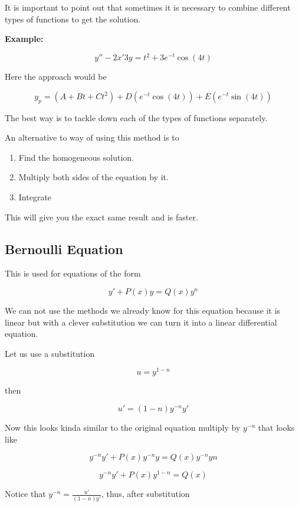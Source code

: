 It is important to point out that sometimes it is necessary to combine different types
of functions to get the solution.

\textbf{Example:}

\[
    y'' -2x' 3y = t^2  + 3e^{-t} \cos (4t)
\]

Here the approach would be

\[
    y_p = (A + Bt + Ct^2) + D(e^{-t}\cos(4t)) + E(e^{-t}\sin(4t))
\]

The best way is to tackle down each of the types of functions separately.

An alternative to way of using this method is to

\begin{enumerate}

    \item Find the homogeneous solution.

    \item Multiply both sides of the equation by it.

    \item Integrate

\end{enumerate}

This will give you the exact same result and is faster.

\subsection{Bernoulli Equation}

This is used for equations of the form 

\[
    y' + P(x)y = Q(x)y^n
\]

We can not use the methods we already know for this equation because it is linear but with a
clever substitution we can turn it into a linear differential equation.

Let us use a substitution 

\[
    u = y^{1 - n}
\] 

then 

\[
    u' = (1 - n)y^{-n} y'
\] 

Now this 
looks kinda similar to the original equation multiply by \(y^{-n}\) that looks like

\[
    y^{-n}y' + P(x)y^{-n}y = Q(x)y^{-n}y{n}
\]

\[
    y^{-n}y' + P(x)y^{1 - n} = Q(x)
\]

Notice that \(y^{-n} = \frac{u'}{(1-n)y'}\), thus, after substitution

